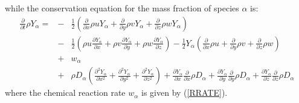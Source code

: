 \documentclass[dvips]{article}
\begin{document}
while the conservation equation for the mass fraction of species
$\alpha$ is:
\begin{eqnarray}
\frac{\partial}{\partial t}\rho Y_{\alpha} =
& - & \frac{1}{2}\left(
 \frac{\partial}{\partial x}\rho u Y_{\alpha} 
+\frac{\partial}{\partial y}\rho v Y_{\alpha} 
+\frac{\partial}{\partial z}\rho w Y_{\alpha}
                 \right) \nonumber\\
& - & \frac{1}{2}\left(
 \rho u\frac{\partial Y_{\alpha}}{\partial x}
+\rho v\frac{\partial Y_{\alpha}}{\partial y}
+\rho w\frac{\partial Y_{\alpha}}{\partial z}
                 \right)
-\frac{1}{2}Y_{\alpha}\left(
 \frac{\partial}{\partial x}\rho u
+\frac{\partial}{\partial y}\rho v
+\frac{\partial}{\partial z}\rho w
             \right) \nonumber\\
& + & w_{\alpha}\nonumber\\
& + & \rho D_{\alpha}
\left(
 \frac{\partial^{2} Y_{\alpha}}{\partial x^{2}}
+\frac{\partial^{2} Y_{\alpha}}{\partial y^{2}}
+\frac{\partial^{2} Y_{\alpha}}{\partial z^{2}}
\right)
+\frac{\partial Y_{\alpha}}{\partial x}
 \frac{\partial}{\partial x}\rho D_{\alpha}
+\frac{\partial Y_{\alpha}}{\partial y}
 \frac{\partial}{\partial y}\rho D_{\alpha}
+\frac{\partial Y_{\alpha}}{\partial z}
 \frac{\partial}{\partial z}\rho D_{\alpha}
\label{EMASSFRACLE}
\end{eqnarray}
where the chemical reaction rate $w_{\alpha}$ is given by (\ref{RRATE}).
\end{document}
